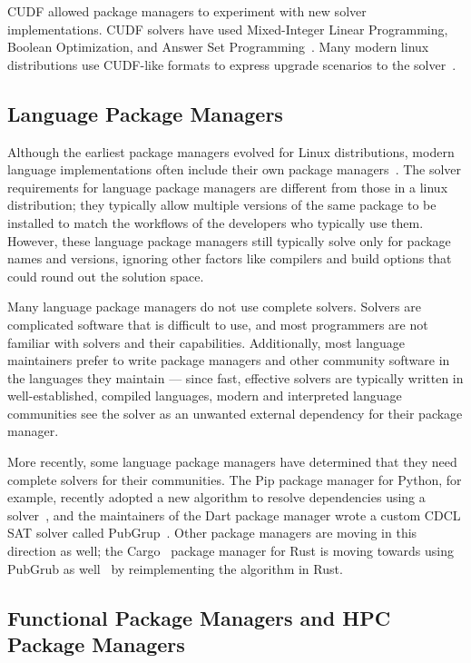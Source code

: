 CUDF allowed package managers to experiment with new solver implementations.
CUDF solvers have used Mixed-Integer Linear Programming, Boolean Optimization, and Answer Set Programming~\cite{michel+:lococo2010,argelich+:lococo2010,gebser+:2011-aspcud}.
Many modern linux distributions use CUDF-like formats to express upgrade scenarios to the solver~\cite{abate2020dependency}.

\subsection{Language Package Managers}

Although the earliest package managers evolved for Linux distributions, modern language implementations often include their own package managers~\cite{npm,pip,cargo,weizenbaum:pubgrub18}.
The solver requirements for language package managers are different from those in a linux distribution; they typically allow multiple versions of the same package to be installed to match the workflows of the developers who typically use them.
However, these language package managers still typically solve only for package names and versions, ignoring other factors like compilers and build options that could round out the solution space.

Many language package managers do not use complete solvers.
Solvers are complicated software that is difficult to use, and most programmers are not familiar with solvers and their capabilities.
Additionally, most language maintainers prefer to write package managers and other community software in the languages they maintain --- since fast, effective solvers are typically written in well-established, compiled languages, modern and interpreted language communities see the solver as an unwanted external dependency for their package manager.

More recently, some language package managers have determined that they need complete solvers for their communities. The Pip package manager for Python, for example, recently adopted a new algorithm to resolve dependencies using a solver~\cite{pip-new-resolver}, and the maintainers of the Dart package manager wrote a custom CDCL SAT solver called PubGrup~\cite{weizenbaum:pubgrub18}.
Other package managers are moving in this direction as well; the Cargo~\cite{cargo} package manager for Rust is moving towards using PubGrub as well~\cite{pubgrub-rs} by reimplementing the algorithm in Rust.

\subsection{Functional Package Managers and HPC Package Managers}

